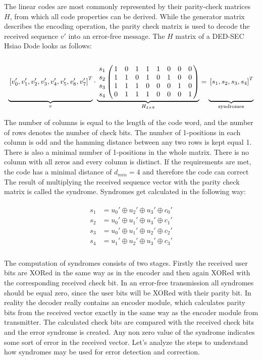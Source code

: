 The linear codes are most commonly represented by their parity-check matrices $H$, from which all code properties can be derived. While the generator matrix describes the encoding operation, the parity check matrix is used to decode the received sequence $v'$ into an error-free message. The $H$ matrix of a DED-SEC Hsiao Dode looks as follows:
\begin{equation*}
\underbrace{
\vphantom{\bordermatrix{&&&&&&&&\cr &1&0&0&0&1&1&1&0\cr&0&1&0&0&0&1&1&1\cr&0&0&1&0&1&0&1&1\cr&0&0&0&1&1&1&0&1\cr}
}\left[v_0',v_1',v_2',v_3',v_4',v_5',v_6',v_7' \right ]^T}_{v}
\cdot \underbrace{\bordermatrix{
&&&&&&&&\cr 
 s_1 &1& 0 & 1 & 1 &1&0&0&0 \cr 
 s_2 &1& 1 & 0 & 1 &0&1&0&0 \cr 
 s_3 &1& 1 & 1 & 0 &0&0&1&0\cr 
 s_4 &0& 1 & 1 & 1 &0&0&0&1
}}_{H_{4\times 8}} = 
\underbrace{
\vphantom{\bordermatrix{&&&&&&&&\cr &1&0&0&0&1&1&1&0\cr&0&1&0&0&0&1&1&1\cr&0&0&1&0&1&0&1&1\cr&0&0&0&1&1&1&0&1\cr}
}\left[s_1,s_2,s_3,s_4 \right ]^T}_{\text{syndromes}}
\end{equation*}

The number of columns is equal to the length of the code word, and the number of rows denotes the number of check bits. The number of 1-positions in each column is odd and the hamming distance between any two rows is kept equal 1. There is also a minimal number of 1-positions in the whole matrix. There is no column with all zeros and every column is distinct. If the requirements are met, the code has a minimal distance of $d_{min} = 4$ and therefore the code can correct The result of multiplying the received sequence vector with the parity check matrix is called the syndrome. Syndromes get calculated in the following way:

\begin{align}
\begin{aligned}
s_1 &= u_0' \oplus u_2' \oplus u_3' \oplus c_0' \\
s_2 &= u_0' \oplus u_1' \oplus u_3' \oplus c_1' \\
s_3 &= u_0' \oplus u_1' \oplus u_2' \oplus c_2' \\
s_4 &= u_1'\oplus u_2' \oplus u_3' \oplus c_3' \\
\end{aligned}
\end{align}

The computation of syndromes consists of two stages. Firstly the received user bits are XORed in the same way as in the encoder and then again XORed with the corresponding received check bit. In an error-free transmission all syndromes should be equal zero, since the user bits will be XORed with their parity bit. In reality the decoder really contains an encoder module, which calculates parity bits from the received vector exactly in the same way as the encoder module from transmitter. The calculated check bits are compared with the received check bits and the error syndrome is created. Any non zero value of the syndrome indicates some sort of error in the received vector. Let's analyze the steps to understand how syndromes may be used for error detection and correction. 


